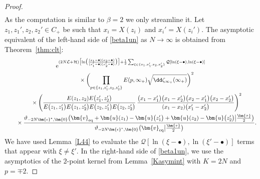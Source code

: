 \documentclass[10pt,a4paper]{amsart}
\numberwithin{equation}{section}
\begin{document}
\begin{proof}
\begin{gather}
 \end{gather}
 As the computation is similar to $\beta = 2$ we only streamline it. Let $z_1,z_1',z_2,z_2' \in C_+$ be such that $x_i = X(z_i)$ and $x_i' = X(z_i')$. The asymptotic equivalent
 of the left-hand side of \eqref{beta1un} as $N \rightarrow \infty$ is obtained from Theorem~\ref{thm:clt}:
\begin{gather}
	{\rm e}^{(2N\mathcal{L} + \mathcal{H})\bigl[\ln\bigl(\frac{(x_1- \bullet)(x_2- \bullet)}{(x_1'- \bullet)(x_2'- \bullet)}\bigr)\bigr] + \frac{1}{2}\sum_{\xi \in \{x_1,x_1',x_2,x_2'\}} \mathcal{Q}[\ln(\xi - \bullet),\ln(\xi - \bullet)]} \nonumber\\
\qquad{}	 \times \biggl(\prod_{p \in \{z_1,z'_1,z_2,z_2'\}} E(p,\infty_+)\sqrt{\dd \zeta_{\infty_+}(\infty_+)}\biggr)^2 \nonumber \\
\qquad{}	 \times \Biggl(\frac{E(z_1,z_2)E\bigl(z'_1,z_2'\bigr)}{E\bigl(z_1,z_1'\bigr)E\bigl(z_1,z_2'\bigr)E\bigl(z_2,z'_1\bigr)E\bigl(z_2,z_2'\bigr)}\,\frac{\bigl(x_1 - x_1'\bigr)\bigl(x_1 - x_2'\bigr)\bigl(x_2 - x_1'\bigr)\bigl(x_2 - x_2'\bigr)}{(x_1 - x_2)\bigl(x_1' - x_2'\bigr)}\Biggr)^2 \nonumber\\
\qquad{}	 \times \frac{\vartheta_{-2N\bm{\epsilon}^*,\bm{0}}\bigl(\bm{v}_{{\rm eq}} + \bm{u}(z_1) - \bm{u}\bigl(z'_1\bigr) + \bm{u}(z_2) - \bm{u}\bigl(z'_2\bigr)\big|\frac{\bm{\tau}}{2}\bigr)}{\vartheta_{-2N\bm{\epsilon}^*,\bm{0}}\bigl(\bm{v}_{{\rm eq}}\big|\frac{\bm{\tau}}{2}\bigr)}.\label{firstune}
\end{gather}
We have used Lemma~\ref{L44} to evaluate the $\mathcal{Q}[\ln(\xi - \bullet),\ln(\xi' - \bullet)]$ terms that appear with $\xi \neq \xi'$. In the right-hand side of \eqref{beta1un}, we use the asymptotics of the $2$-point kernel from Lemma~\ref{Kasymint} with $K = 2N$ and $p = \mp 2$.




\end{proof}
\end{document}
